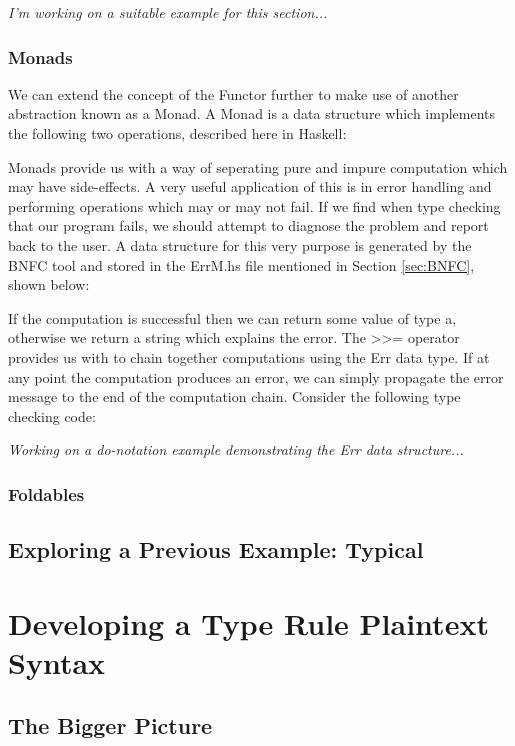\documentclass{UoYCSproject}
\begin{document}
\textit{I'm working on a suitable example for this section...}

\subsection{Monads}
We can extend the concept of the Functor further to make use of another
abstraction known as a Monad. A Monad is a data structure which implements the
following two operations, described here in Haskell:

Monads provide us with a way of seperating pure and impure computation which
may have side-effects. A very useful application of this is in error handling
and performing operations which may or may not fail. If we find when type
checking that our program fails, we should attempt to diagnose the problem and
report back to the user. A data structure for this very purpose is generated by
the BNFC tool and stored in the {\ttfamily ErrM.hs} file mentioned in Section
\ref{sec:BNFC}, shown below:

If the computation is successful then we can return some value of type
{\ttfamily a}, otherwise we return a string which explains the error. The
{\ttfamily >>=} operator provides us with to chain together computations using
the {\ttfamily Err} data type. If at any point the computation produces an
error, we can simply propagate the error message to the end of the computation
chain. Consider the following type checking code:
%

\textit{Working on a do-notation example demonstrating the Err data structure...}

\subsection{Foldables}

\cite{MilewskiCTFP}

\section{Exploring a Previous Example: Typical}
\cite{Typical}

\chapter{Developing a Type Rule Plaintext Syntax}

\section{The Bigger Picture}
\end{document}
